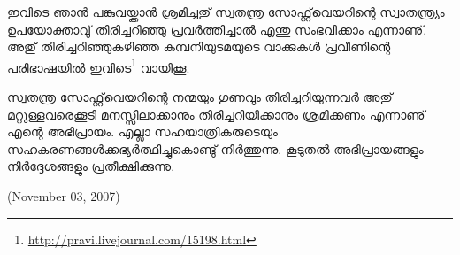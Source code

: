 ഇവിടെ ഞാന്‍ പങ്കുവയ്ക്കാന്‍ ശ്രമിച്ചതു് സ്വതന്ത്ര സോഫ്റ്റ്‌വെയറിന്റെ സ്വാതന്ത്ര്യം ഉപയോക്താവു് തിരിച്ചറിഞ്ഞു പ്രവര്‍ത്തിച്ചാല്‍ എന്തു സംഭവിക്കാം എന്നാണു്. അതു് തിരിച്ചറിഞ്ഞുകഴിഞ്ഞ കമ്പനിയുടമയുടെ വാക്കുകള്‍ പ്രവീണിന്റെ പരിഭാഷയില്‍ ഇവിടെ\footnote{\url{http://pravi.livejournal.com/15198.html}} വായിക്കൂ.

സ്വതന്ത്ര സോഫ്റ്റ്‌വെയറിന്റെ നന്മയും ഗുണവും തിരിച്ചറിയുന്നവര്‍ അതു് മറ്റുള്ളവരെക്കൂടി മനസ്സിലാക്കാനും തിരിച്ചറിയിക്കാനും ശ്രമിക്കണം എന്നാണു് എന്റെ അഭിപ്രായം. 
എല്ലാ സഹയാത്രികരുടെയും സഹകരണങ്ങള്‍ക്കഭ്യര്‍ത്ഥിച്ചുകൊണ്ടു് നിര്‍ത്തുന്നു. കൂടുതല്‍ അഭിപ്രായങ്ങളും നിര്‍ദ്ദേശങ്ങളും പ്രതീക്ഷിക്കുന്നു.

\begin{flushright}(November 03, 2007)\end{flushright}
\newpage
